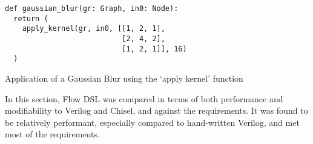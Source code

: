 \begin{listing}[H]
  \begin{verbatim}
def gaussian_blur(gr: Graph, in0: Node):
  return (
    apply_kernel(gr, in0, [[1, 2, 1],
                           [2, 4, 2],
                           [1, 2, 1]], 16)
  )
  \end{verbatim}
  \caption{Application of a Gaussian Blur using the `apply kernel' function}\label{python.gb.kernel}
\end{listing}

\par\noindent\hrulefill\par

In this section, Flow DSL was compared in terms of both performance and modifiability to Verilog and Chisel, and against the requirements. It was found to be relatively performant, especially compared to hand-written Verilog, and met most of the requirements.